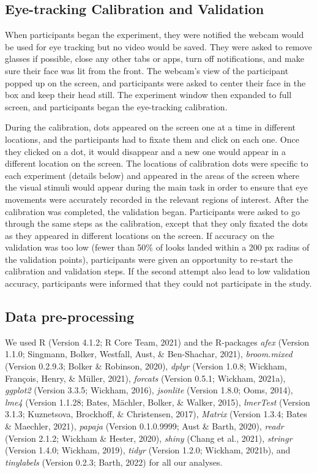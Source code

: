 \documentclass[
  man,floatsintext]{apa6}
\begin{document}
\hypertarget{eye-tracking-calibration-and-validation}{%
\subsection{Eye-tracking Calibration and Validation}\label{eye-tracking-calibration-and-validation}}

When participants began the experiment, they were notified the webcam would be used for eye tracking but no video would be saved. They were asked to remove glasses if possible, close any other tabs or apps, turn off notifications, and make sure their face was lit from the front. The webcam's view of the participant popped up on the screen, and participants were asked to center their face in the box and keep their head still. The experiment window then expanded to full screen, and participants began the eye-tracking calibration.

During the calibration, dots appeared on the screen one at a time in different locations, and the participants had to fixate them and click on each one. Once they clicked on a dot, it would disappear and a new one would appear in a different location on the screen. The locations of calibration dots were specific to each experiment (details below) and appeared in the areas of the screen where the visual stimuli would appear during the main task in order to ensure that eye movements were accurately recorded in the relevant regions of interest. After the calibration was completed, the validation began. Participants were asked to go through the same steps as the calibration, except that they only fixated the dots as they appeared in different locations on the screen. If accuracy on the validation was too low (fewer than 50\% of looks landed within a 200 px radius of the validation points), participants were given an opportunity to re-start the calibration and validation steps. If the second attempt also lead to low validation accuracy, participants were informed that they could not participate in the study.

\hypertarget{data-pre-processing}{%
\subsection{Data pre-processing}\label{data-pre-processing}}

We used R (Version 4.1.2; R Core Team, 2021) and the R-packages \emph{afex} (Version 1.1.0; Singmann, Bolker, Westfall, Aust, \& Ben-Shachar, 2021), \emph{broom.mixed} (Version 0.2.9.3; Bolker \& Robinson, 2020), \emph{dplyr} (Version 1.0.8; Wickham, François, Henry, \& Müller, 2021), \emph{forcats} (Version 0.5.1; Wickham, 2021a), \emph{ggplot2} (Version 3.3.5; Wickham, 2016), \emph{jsonlite} (Version 1.8.0; Ooms, 2014), \emph{lme4} (Version 1.1.28; Bates, Mächler, Bolker, \& Walker, 2015), \emph{lmerTest} (Version 3.1.3; Kuznetsova, Brockhoff, \& Christensen, 2017), \emph{Matrix} (Version 1.3.4; Bates \& Maechler, 2021), \emph{papaja} (Version 0.1.0.9999; Aust \& Barth, 2020), \emph{readr} (Version 2.1.2; Wickham \& Hester, 2020), \emph{shiny} (Chang et al., 2021), \emph{stringr} (Version 1.4.0; Wickham, 2019), \emph{tidyr} (Version 1.2.0; Wickham, 2021b), and \emph{tinylabels} (Version 0.2.3; Barth, 2022) for all our analyses.
\end{document}
